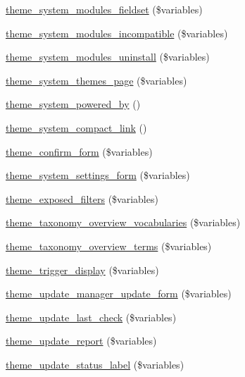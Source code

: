 \begin{DoxyCompactItemize}
\item 
\hyperlink{group__themeable_gaeb3bb95c88bcc506c972e8bc92550ffa}{theme\_\-system\_\-modules\_\-fieldset} (\$variables)
\item 
\hyperlink{group__themeable_ga2b92c41a106a88c6adea84fc06bfeb55}{theme\_\-system\_\-modules\_\-incompatible} (\$variables)
\item 
\hyperlink{group__themeable_ga9128d4735bfebfb459217e0b10d4400c}{theme\_\-system\_\-modules\_\-uninstall} (\$variables)
\item 
\hyperlink{group__themeable_gaea95a9176e04f5ad0707f3adfc59efa6}{theme\_\-system\_\-themes\_\-page} (\$variables)
\item 
\hyperlink{group__themeable_ga706047c3b15fd20658af56eb234573e4}{theme\_\-system\_\-powered\_\-by} ()
\item 
\hyperlink{group__themeable_gab5d8809d11a9e2ee4b06c8f14f8258f3}{theme\_\-system\_\-compact\_\-link} ()
\item 
\hyperlink{group__themeable_ga21630d5749786400d03449b295f9a31d}{theme\_\-confirm\_\-form} (\$variables)
\item 
\hyperlink{group__themeable_ga61657b80e20cf36542ce65894984df79}{theme\_\-system\_\-settings\_\-form} (\$variables)
\item 
\hyperlink{group__themeable_ga8750c0043fa9aecbe88594d8b018fa3c}{theme\_\-exposed\_\-filters} (\$variables)
\item 
\hyperlink{group__themeable_ga8037235a6d606e3f579783845327fdc0}{theme\_\-taxonomy\_\-overview\_\-vocabularies} (\$variables)
\item 
\hyperlink{group__themeable_gabcead84347c45b0e1316953ab53bf3ad}{theme\_\-taxonomy\_\-overview\_\-terms} (\$variables)
\item 
\hyperlink{group__themeable_gae3ba9f8ddcdcd9514c5988e072a9334c}{theme\_\-trigger\_\-display} (\$variables)
\item 
\hyperlink{group__themeable_gabb2fc045b955c164831ddb609f8720c7}{theme\_\-update\_\-manager\_\-update\_\-form} (\$variables)
\item 
\hyperlink{group__themeable_ga18d1e2e6354e6240afb36496fac2239a}{theme\_\-update\_\-last\_\-check} (\$variables)
\item 
\hyperlink{group__themeable_gab9223d8dc740de3fd1b9fd98c819e438}{theme\_\-update\_\-report} (\$variables)
\item 
\hyperlink{group__themeable_ga0207c01d37d3cb060dabc28b55db5285}{theme\_\-update\_\-status\_\-label} (\$variables)
\item 

\end{DoxyCompactItemize}
